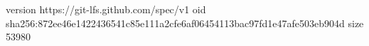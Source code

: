 version https://git-lfs.github.com/spec/v1
oid sha256:872ee46e1422436541c85e111a2cfe6af06454113bac97fd1e47afe503eb904d
size 53980
